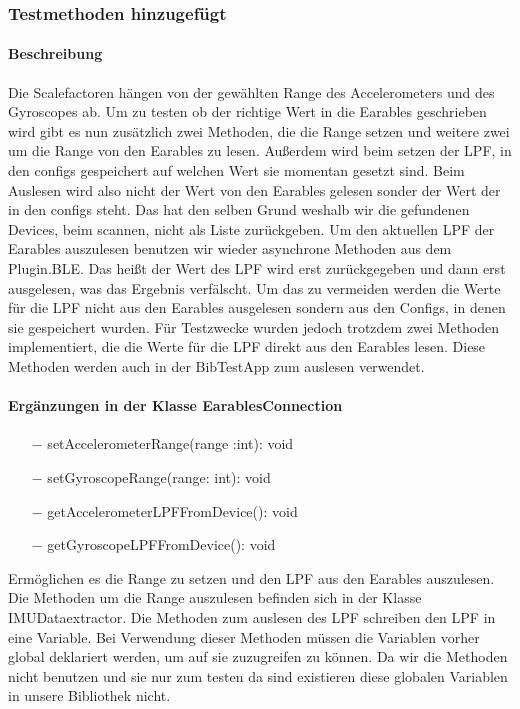 \documentclass[a4paper,12pt]{article}
\begin{document}
\subsubsection{Testmethoden hinzugefügt}
\paragraph{Beschreibung}
Die Scalefactoren hängen von der gewählten Range des Accelerometers und des Gyroscopes ab. Um zu testen ob der richtige Wert in die  Earables geschrieben wird gibt es nun zusätzlich zwei Methoden, die die Range setzen und weitere zwei um die Range von den Earables zu lesen.
Außerdem wird beim setzen der LPF, in den configs gespeichert auf welchen Wert sie momentan gesetzt sind. Beim Auslesen wird also nicht der Wert von den Earables gelesen sonder der Wert der in den configs steht. Das hat den selben Grund weshalb wir die gefundenen Devices, beim scannen, nicht als Liste zurückgeben. Um den aktuellen LPF der Earables auszulesen benutzen wir wieder asynchrone Methoden aus dem Plugin.BLE. Das heißt der Wert des LPF wird erst zurückgegeben und dann erst ausgelesen, was das Ergebnis verfälscht. Um das zu vermeiden werden die Werte für die LPF nicht aus den Earables ausgelesen sondern aus den Configs, in denen sie gespeichert wurden. Für Testzwecke wurden jedoch trotzdem zwei Methoden implementiert, die die Werte für die LPF direkt aus den Earables lesen. Diese Methoden werden auch in der BibTestApp zum auslesen verwendet.

\paragraph{Ergänzungen in der Klasse EarablesConnection}
\begin{itemize}
	\item[$-$] setAccelerometerRange(range :int): void
	\item[$-$] setGyroscopeRange(range: int): void
	\item[$-$ ] getAccelerometerLPFFromDevice(): void
	\item[$-$ ] getGyroscopeLPFFromDevice(): void
\end{itemize}
Ermöglichen es die Range zu setzen und den LPF aus den Earables auszulesen. Die Methoden um die Range auszulesen befinden sich in der Klasse IMUDataextractor. Die Methoden zum auslesen des  LPF schreiben den LPF in eine Variable. Bei Verwendung dieser Methoden müssen die Variablen vorher global deklariert werden, um auf sie zuzugreifen zu können. Da wir die Methoden nicht benutzen und sie nur zum testen da sind existieren diese globalen Variablen in unsere Bibliothek nicht.
\end{document}
